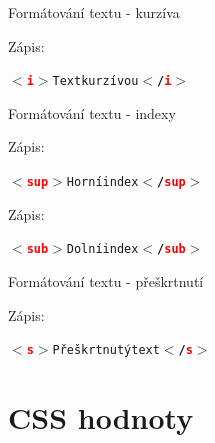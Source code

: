 \documentclass[aspectratio=169]{beamer}
\begin{document}
\begin{frame}{Formátování textu - kurzíva}
    \begin{cardTiny}
        \begin{flushleft}
            Zápis: \begin{alltt}\textbf{$<$\textcolor{red}{i}$>$}Text kurzívou\textbf{$<$/\textcolor{red}{i}$>$}\end{alltt}
        \end{flushleft}
    \end{cardTiny}
\end{frame}

\begin{frame}{Formátování textu - indexy}
    \begin{cardTiny}
        \begin{flushleft}
            Zápis: \begin{alltt}\textbf{$<$\textcolor{red}{sup}$>$}Horní index\textbf{$<$/\textcolor{red}{sup}$>$}\end{alltt}
        \end{flushleft}
    \end{cardTiny}
    \begin{cardTiny}
        \begin{flushleft}
            Zápis: \begin{alltt}\textbf{$<$\textcolor{red}{sub}$>$}Dolní index\textbf{$<$/\textcolor{red}{sub}$>$}\end{alltt}
        \end{flushleft}
    \end{cardTiny}
\end{frame}

\begin{frame}{Formátování textu - přeškrtnutí}
    \begin{cardTiny}
        \begin{flushleft}
            Zápis: \begin{alltt}\textbf{$<$\textcolor{red}{s}$>$}Přeškrtnutý text\textbf{$<$/\textcolor{red}{s}$>$}\end{alltt}
        \end{flushleft}
    \end{cardTiny}
\end{frame}



\section{CSS hodnoty}
\end{document}
